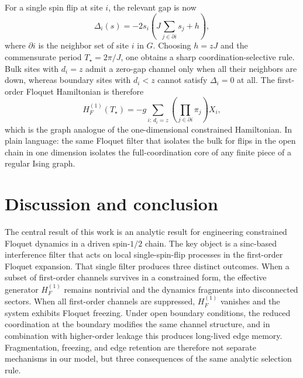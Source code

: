 \documentclass[aps,prb,reprint,twocolumn,amsmath,amssymb,citeautoscript]{revtex4-2}
\begin{document}
For a single spin flip at site $i$, the relevant gap is now
\begin{equation}
\Delta_i(s)=-2s_i\left(J\sum_{j\in\partial i}s_j+h\right),
\label{eq:Delta_i_graph}
\end{equation}
where $\partial i$ is the neighbor set of site $i$ in $G$. Choosing $h=zJ$ and the commensurate period $T_\star=2\pi/J$, one obtains a sharp coordination-selective rule. Bulk sites with $d_i=z$ admit a zero-gap channel only when all their neighbors are down, whereas boundary sites with $d_i<z$ cannot satisfy $\Delta_i=0$ at all. The first-order Floquet Hamiltonian is therefore
\begin{equation}
H_F^{(1)}(T_\star)=
-g\sum_{i:\,d_i=z}\left(\prod_{j\in\partial i}\pi_j\right)X_i,
\label{eq:HF1_graph_final}
\end{equation}
which is the graph analogue of the one-dimensional constrained Hamiltonian. In plain language: the same Floquet filter that isolates the bulk for flips in the open chain in one dimension isolates the full-coordination core of any finite piece of a regular Ising graph. 

\section{Discussion and conclusion}
\label{sec:discussion}

The central result of this work is an analytic result for engineering constrained Floquet dynamics in a driven spin-$1/2$ chain. The key object is a sinc-based interference filter that acts on local single-spin-flip processes in the first-order Floquet expansion. That single filter produces three distinct outcomes. When a subset of first-order channels survives in a constrained form, the effective generator $H_F^{(1)}$ remains nontrivial and the dynamics fragments into disconnected sectors. When all first-order channels are suppressed, $H_F^{(1)}$ vanishes and the system exhibits Floquet freezing. Under open boundary conditions, the reduced coordination at the boundary modifies the same channel structure, and in combination with higher-order leakage this produces long-lived edge memory. Fragmentation, freezing, and edge retention are therefore not separate mechanisms in our model, but three consequences of the same analytic selection rule.
\end{document}
